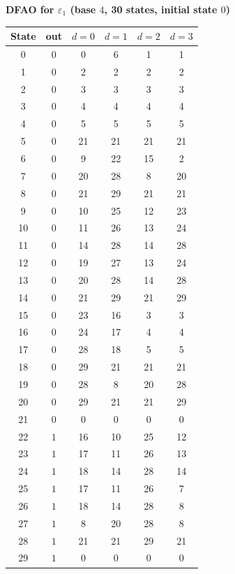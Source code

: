 \documentclass[12pt]{article}
\theoremstyle{definition}
\theoremstyle{remark}
\begin{document}
\noindent\begin{minipage}{\linewidth}
\textbf{DFAO for $\varepsilon_1$ (base $4$, 30 states, initial state $0$)}

\begin{center}
\renewcommand{\arraystretch}{1.1}
\begin{tabular}{c|c|cccc}
State & out & $d=0$ & $d=1$ & $d=2$ & $d=3$ \\\hline
0 & $0$ & 0 & 6 & 1 & 1 \\
1 & $0$ & 2 & 2 & 2 & 2 \\
2 & $0$ & 3 & 3 & 3 & 3 \\
3 & $0$ & 4 & 4 & 4 & 4 \\
4 & $0$ & 5 & 5 & 5 & 5 \\
5 & $0$ & 21 & 21 & 21 & 21 \\
6 & $0$ & 9 & 22 & 15 & 2 \\
7 & $0$ & 20 & 28 & 8 & 20 \\
8 & $0$ & 21 & 29 & 21 & 21 \\
9 & $0$ & 10 & 25 & 12 & 23 \\
10 & $0$ & 11 & 26 & 13 & 24 \\
11 & $0$ & 14 & 28 & 14 & 28 \\
12 & $0$ & 19 & 27 & 13 & 24 \\
13 & $0$ & 20 & 28 & 14 & 28 \\
14 & $0$ & 21 & 29 & 21 & 29 \\
15 & $0$ & 23 & 16 & 3 & 3 \\
16 & $0$ & 24 & 17 & 4 & 4 \\
17 & $0$ & 28 & 18 & 5 & 5 \\
18 & $0$ & 29 & 21 & 21 & 21 \\
19 & $0$ & 28 & 8 & 20 & 28 \\
20 & $0$ & 29 & 21 & 21 & 29 \\
21 & $0$ & 0 & 0 & 0 & 0 \\
22 & $1$ & 16 & 10 & 25 & 12 \\
23 & $1$ & 17 & 11 & 26 & 13 \\
24 & $1$ & 18 & 14 & 28 & 14 \\
25 & $1$ & 17 & 11 & 26 & 7 \\
26 & $1$ & 18 & 14 & 28 & 8 \\
27 & $1$ & 8 & 20 & 28 & 8 \\
28 & $1$ & 21 & 21 & 29 & 21 \\
29 & $1$ & 0 & 0 & 0 & 0 \\
\end{tabular}
\end{center}
\end{minipage}
\bigskip
\end{document}
